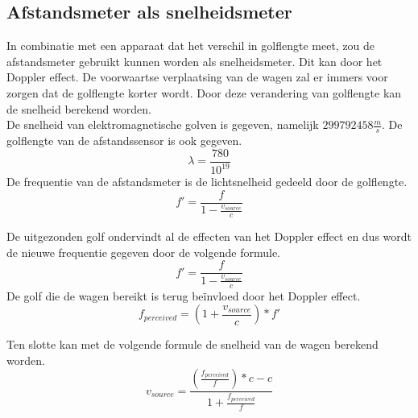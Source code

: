  

\subsection{Afstandsmeter als snelheidsmeter}
In combinatie met een apparaat dat het verschil in golflengte meet, zou de afstandsmeter gebruikt kunnen worden als snelheidsmeter. Dit kan door het Doppler effect. De voorwaartse verplaatsing van de wagen zal er immers voor zorgen dat de golflengte korter wordt. Door deze verandering van golflengte kan de snelheid berekend worden.\\

De snelheid van elektromagnetische golven is gegeven, namelijk $299792458 \frac{m}{s}$. De golflengte van de afstandssensor is ook gegeven. $$\lambda = \frac{780}{10^{19}}$$
De frequentie van de afstandsmeter is de lichtsnelheid gedeeld door de golflengte.
\begin{equation}
f'=\frac{f}{1-\frac{v_{source}}{c}}
\end{equation}

De uitgezonden golf ondervindt al de effecten van het Doppler effect en dus wordt de nieuwe frequentie gegeven door de volgende formule.
\begin{equation}
f'=\frac{f}{1-\frac{v_{source}}{c}}
\end{equation}
De golf die de wagen bereikt is terug beïnvloed door het Doppler effect.
\begin{equation}
f_{perceived}=\left(1+\frac{v_{source}}{c}\right)*f'
\end{equation}

Ten slotte kan met de volgende formule de snelheid van de wagen berekend worden.
\begin{equation}
v_{source} = \frac{\left(\frac{f_{perceived}}{f}\right)*c-c}{1+\frac{f_{perceived}}{f}}
\end{equation}
